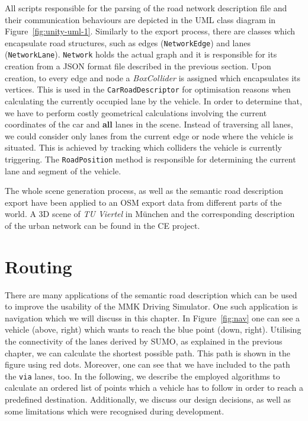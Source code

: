 All scripts responsible for the parsing of the road network description file and their communication behaviours are depicted in the UML class diagram in Figure~\ref{fig:unity-uml-1}. Similarly to the export process, there are classes which encapsulate road structures, such as edges (\texttt{NetworkEdge}) and lanes (\texttt{NetworkLane}). \texttt{Network} holds the actual graph and it is responsible for its creation from a JSON format file described in the previous section. Upon creation, to every edge and node a \emph{BoxCollider} is assigned which encapsulates its vertices. This is used in the \texttt{CarRoadDescriptor} for optimisation reasons when calculating the currently occupied lane by the vehicle. In order to determine that, we have to perform costly geometrical calculations involving the current coordinates of the car and \textbf{all} lanes in the scene. Instead of traversing all lanes, we could consider only lanes from the current edge or node where the vehicle is situated. This is achieved by tracking which colliders the vehicle is currently triggering. The \texttt{RoadPosition} method is responsible for determining the current lane and segment of the vehicle.

The whole scene generation process, as well as the semantic road description export have been applied to an OSM export data from different parts of the world. A 3D scene of \emph{TU Viertel} in M\"unchen and the corresponding description of the urban network can be found in the CE project. 



\chapter{Routing}
\label{ch:gps}

There are many applications of the semantic road description which can be used to improve the usability of the MMK Driving Simulator. One such application is navigation which we will discuss in this chapter. In Figure~\ref{fig:nav} one can see a vehicle (above, right) which wants to reach the blue point (down, right). Utilising the connectivity of the lanes derived by SUMO, as explained in the previous chapter, we can calculate the shortest possible path. This path is shown in the figure using red dots. Moreover, one can see that we have included to the path the \texttt{via} lanes, too. In the following, we describe the employed algorithms to calculate an ordered list of points which a vehicle has to follow in order to reach a predefined destination. Additionally, we discuss our design decisions, as well as some limitations which were recognised during development.

